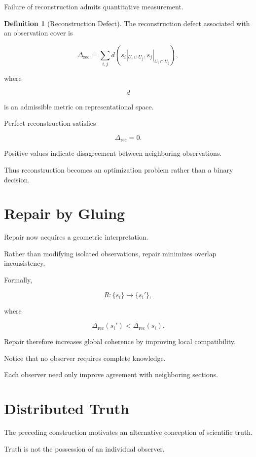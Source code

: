 \documentclass[11pt,oneside]{book}
\numberwithin{equation}{chapter}
\theoremstyle{definition}
\newtheorem{definition}{Definition}[chapter]
\theoremstyle{plain}
\begin{document}
Failure of reconstruction admits quantitative measurement.

\begin{definition}[Reconstruction Defect]

The reconstruction defect associated with an observation cover is

\[
\Delta_{\mathrm{rec}}
=
\sum_{i,j}
d
\!\left(
s_i|_{U_i\cap U_j},
s_j|_{U_i\cap U_j}
\right),
\]

where

\[
d
\]

is an admissible metric on representational space.

\end{definition}

Perfect reconstruction satisfies

\[
\Delta_{\mathrm{rec}}
=
0.
\]

Positive values indicate disagreement between neighboring observations.

Thus reconstruction becomes an optimization problem rather than a binary
decision.

\section{Repair by Gluing}

Repair now acquires a geometric interpretation.

Rather than modifying isolated observations, repair minimizes overlap
inconsistency.

Formally,

\[
R
:
\{
s_i
\}
\longrightarrow
\{
s_i'
\},
\]

where

\[
\Delta_{\mathrm{rec}}
(s_i')
<
\Delta_{\mathrm{rec}}
(s_i).
\]

Repair therefore increases global coherence by improving local compatibility.

Notice that no observer requires complete knowledge.

Each observer need only improve agreement with neighboring sections.

\section{Distributed Truth}

The preceding construction motivates an alternative conception of scientific
truth.

Truth is not the possession of an individual observer.
\end{document}
